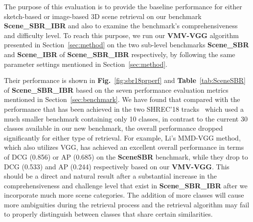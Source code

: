 \documentclass[times, 10pt,twocolumn]{article}
\begin{document}
 


The purpose of this evaluation is to provide the baseline performance for either sketch-based or image-based 3D scene retrieval on our benchmark \textbf{Scene\_SBR\_IBR} and also to examine the benchmark's comprehensiveness and difficulty level. To reach this purpose, we run our \textbf{VMV-VGG} algorithm presented in Section~\ref{sec:method} on the two sub-level benchmarks \textbf{Scene\_SBR} and \textbf{Scene\_IBR} of \textbf{Scene\_SBR\_IBR} respectively, by following the same parameter settings mentioned in Section~\ref{sec:method}. 

Their performance is shown in \textbf{Fig.}~\ref{fig:sbr18prperf} and \textbf{Table}~\ref{tab:SceneSBR} of \textbf{Scene\_SBR\_IBR} based on the seven performance evaluation metrics mentioned in Section~\ref{sec:benchmark}.  We have found that compared with the performance that has been achieved in the two SHREC'18 tracks~\cite{DBLP:conf/3dor/YuanLL18,  DBLP:conf/3dor/AbdulJLL18} which used a much smaller benchmark containing only 10 classes, in contrast to the current 30 classes available in our new benchmark, the overall performance dropped significantly for either type of retrieval. For example, Li's MMD-VGG method, which also utilizes VGG, has achieved an excellent overall performance in terms of DCG (0.856) or AP (0.685) on the \textbf{SceneSBR} benchmark, while they drop to DCG (0.533) and AP (0.244) respectively based on our \textbf{VMV-VGG}. This should be a direct and natural result after a substantial increase in the comprehensiveness and challenge level that exist in \textbf{Scene\_SBR\_IBR} after we incorporate much more scene categories. The addition of more classes will cause more ambiguities during the retrieval process and the retrieval algorithm may fail to properly distinguish between classes that share certain similarities. 


\end{document}
